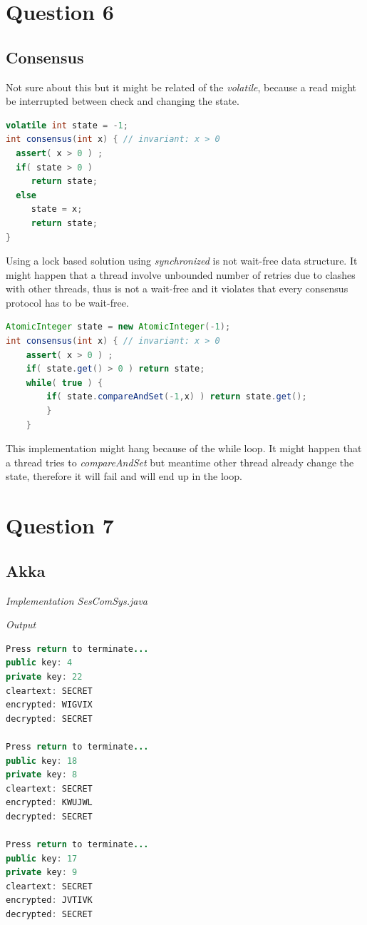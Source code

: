 \documentclass[format=acmsmall, review=false, screen=true]{acmart}
\begin{document}
\section{Question 6}

\subsection{Consensus}

Not sure about this but it might be related of the \textit{volatile}, because a read might be interrupted between check and changing the state.

\begin{lstlisting}[language=java]
volatile int state = -1;
int consensus(int x) { // invariant: x > 0
  assert( x > 0 ) ;
  if( state > 0 )
     return state;
  else
	 state = x;
     return state;
}
\end{lstlisting}

Using a lock based solution using \textit{synchronized} is not wait-free data structure. It might happen that a thread involve unbounded number of retries due to clashes with other threads, thus is not a wait-free and it violates that every consensus protocol has to be wait-free.

\begin{lstlisting}[language=java]
AtomicInteger state = new AtomicInteger(-1);
int consensus(int x) { // invariant: x > 0
    assert( x > 0 ) ;
    if( state.get() > 0 ) return state;
    while( true ) {
        if( state.compareAndSet(-1,x) ) return state.get();
        }
    }
\end{lstlisting}

This implementation might hang because of the while loop. It might happen that a thread
tries to \textit{compareAndSet} but meantime other thread already change the state, therefore it will fail and will end up in the loop.

\section{Question 7}

\subsection{Akka}

\textit{Implementation SesComSys.java}

\textit{Output}

\begin{lstlisting}[language=java]
Press return to terminate...
public key: 4
private key: 22
cleartext: SECRET
encrypted: WIGVIX
decrypted: SECRET

Press return to terminate...
public key: 18
private key: 8
cleartext: SECRET
encrypted: KWUJWL
decrypted: SECRET

Press return to terminate...
public key: 17
private key: 9
cleartext: SECRET
encrypted: JVTIVK
decrypted: SECRET
\end{lstlisting}
\end{document}
